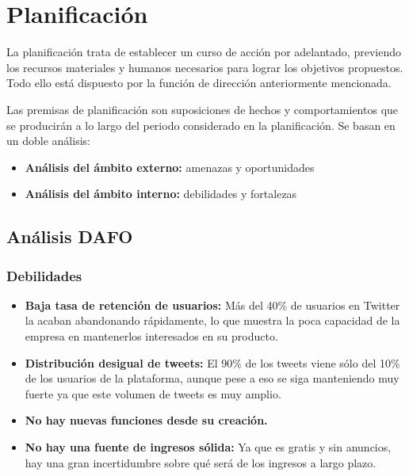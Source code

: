 \section{Planificación}

La planificación trata de establecer un curso de acción por adelantado, previendo los recursos materiales y humanos necesarios para lograr los objetivos propuestos. Todo ello está dispuesto por la función de dirección anteriormente mencionada.

Las premisas de planificación son suposiciones de hechos y comportamientos que se producirán a lo largo del periodo considerado en la planificación. Se basan en un doble análisis: 

\begin{itemize}

\item \textbf{Análisis del ámbito externo:} amenazas y oportunidades
\item \textbf{Análisis del ámbito interno:} debilidades y fortalezas 

\end{itemize}

\subsection{Análisis DAFO}

\subsubsection{Debilidades}

\begin{itemize}

\item \textbf{Baja tasa de retención de usuarios:} Más del 40\% de usuarios en Twitter la acaban abandonando rápidamente, lo que muestra la poca capacidad de la empresa en mantenerlos interesados en su producto.
\item \textbf{Distribución desigual de tweets:} El 90\% de los tweets viene sólo del 10\% de los usuarios de la plataforma, aunque pese a eso se siga manteniendo muy fuerte ya que este volumen de tweets es muy amplio.
\item \textbf{No hay nuevas funciones desde su creación.}
\item \textbf{No hay una fuente de ingresos sólida:} Ya que es gratis y sin anuncios, hay una gran incertidumbre sobre qué será de los ingresos a largo plazo.

\end{itemize}

